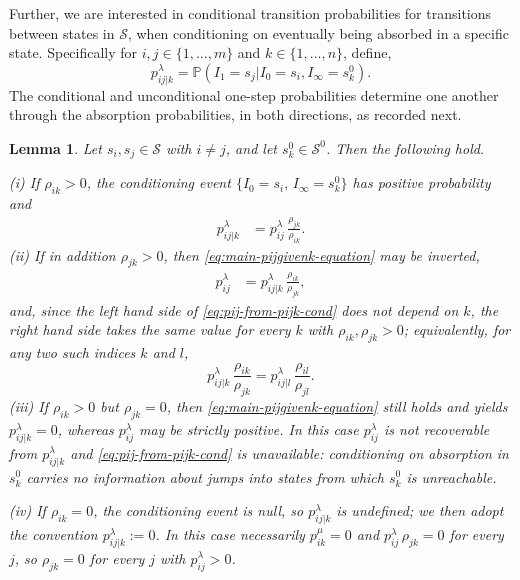 \documentclass{article}
\newtheorem{lemma}{Lemma}
\newcommand{\cs}{\mathcal{S}}
\newenvironment{subrevision}{}{}
\begin{document}
Further, we are interested in conditional transition probabilities for transitions between states in $\cs$, when conditioning on eventually being absorbed in a specific state. Specifically for $i,j \in \{1,\ldots,m\}$ and $k \in \{1,\ldots,n\}$, define,
%
\[
p^\lambda_{ij |k} = \mathbb{P}(I_{1}=s_j\vert I_0 = s_i, I_{\infty}=s^0_k).
\]
%
The conditional and unconditional one-step probabilities determine one another through the
absorption probabilities, in both directions, as recorded next.

\begin{subrevision}
\begin{lemma}
\label{lem:cond-jump-probs}
Let $s_i, s_j \in \cs$ with $i \neq j$, and let $s^0_k \in \cs^0$. Then the following hold.

\noindent \textup{(i)} If $\rho_{ik} > 0$, the conditioning event $\{I_0 = s_i,\, I_\infty = s^0_k\}$
has positive probability and
%
\begin{align}
\label{eq:main-pijgivenk-equation}
p^\lambda_{ij|k} &= p_{ij}^{\lambda}\, \frac{\rho_{jk}}{\rho_{ik}}.
\end{align}
%
\noindent \textup{(ii)} If in addition $\rho_{jk} > 0$, then \eqref{eq:main-pijgivenk-equation} may be
inverted,
%
\begin{align}
\label{eq:pij-from-pijk-cond}
p_{ij}^{\lambda} &= p^\lambda_{ij|k}\, \frac{\rho_{ik}}{\rho_{jk}},
\end{align}
%
and, since the left hand side of \eqref{eq:pij-from-pijk-cond} does not depend on $k$, the right hand
side takes the same value for every $k$ with $\rho_{ik}, \rho_{jk} > 0$; equivalently, for any two
such indices $k$ and $l$,
%
\begin{equation}
\label{eq:pijk-consistency}
p^\lambda_{ij|k}\, \frac{\rho_{ik}}{\rho_{jk}}
=
p^\lambda_{ij|l}\, \frac{\rho_{il}}{\rho_{jl}}.
\end{equation}
%
\noindent \textup{(iii)} If $\rho_{ik} > 0$ but $\rho_{jk} = 0$, then \eqref{eq:main-pijgivenk-equation}
still holds and yields $p^\lambda_{ij|k} = 0$, whereas $p^\lambda_{ij}$ may be strictly positive. In
this case $p^\lambda_{ij}$ is not recoverable from $p^\lambda_{ij|k}$ and
\eqref{eq:pij-from-pijk-cond} is unavailable: conditioning on absorption in $s^0_k$ carries no
information about jumps into states from which $s^0_k$ is unreachable.

\noindent \textup{(iv)} If $\rho_{ik} = 0$, the conditioning event is null, so $p^\lambda_{ij|k}$ is
undefined; we then adopt the convention $p^\lambda_{ij|k} := 0$. In this case necessarily
$p^\mu_{ik} = 0$ and $p^\lambda_{ij}\, \rho_{jk} = 0$ for every $j$, so $\rho_{jk} = 0$ for every $j$
with $p^\lambda_{ij} > 0$.


\end{lemma}
\end{subrevision}
\end{document}

